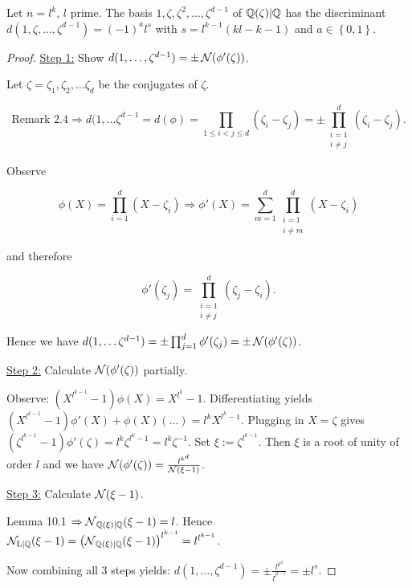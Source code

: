 \begin{Prop}
	Let $n = l^k$, $l$ prime. The basis $1, \zeta, \zeta^2, \dots, \zeta^{d-1}$ of $\mathbb{Q}(\zeta) \vert \mathbb{Q}$ has the discriminant $d(1, \zeta, \dots, \zeta^{d-1}) = (-1)^a l^s$ with $s = l^{k-1}(kl -k -1)$ and $a \in \left\lbrace  0,1 \right\rbrace $.
\end{Prop}
\begin{proof}
	\underline{Step 1:} Show $d(1,\dots, \zeta^{d-1}) = \pm \operatorname{\mathcal{N}}(\phi'(\zeta))$. 
	
	Let $\zeta = \zeta_1, \zeta_2, \dots \zeta_d$ be the conjugates of $\zeta$. 
	
	\[
		\text{Remark 2.4} \Rightarrow d(1, \dots \zeta^{d-1} = d(\phi) = \prod_{1 \leq i < j \leq d} (\zeta_i - \zeta_j) = \pm \prod_{\substack{i = 1 \\ i \neq j }}^d (\zeta_i - \zeta_j).
	\]
	
	Observe
	
	\[
		\phi(X) = \prod_{i=1}^d (X - \zeta_i) \Rightarrow \phi'(X) = \sum_{m=1}^d \prod_{\substack{i=1 \\ i \neq m}}^d (X - \zeta_i)
	\]
	
	and therefore
	
	\[
		\phi'(\zeta_j) = \prod_{\substack{i=1 \\ i \neq j}}^d (\zeta_j - \zeta_i).
	\]
	
	Hence we have $d(1, \dots \zeta^{d-1}) = \pm \prod_{j=1}^d \phi'(\zeta_j) = \pm \operatorname{\mathcal{N}} (\phi'(\zeta))$.
	
	\bigskip
	
	\underline{Step 2:} Calculate $\operatorname{\mathcal{N}}(\phi'(\zeta))$ partially.
	
	Observe: $(X^{l^{k-1}}-1)\phi(X) = X^{l^k}-1$. Differentiating yields $(X^{l^{k-1}}-1)\phi'(X) + \phi(X)(\dots) = l^k X^{l^k-1}$. Plugging in $X = \zeta$ gives $(\zeta^{l^{k-1}}-1)\phi'(\zeta) = l^k \zeta^{l^k-1} = l^k \zeta^{-1}$. Set $\xi := \zeta^{l^{k-1}}$. Then $\xi$ is a root of unity of order $l$ and we have $\operatorname{\mathcal{N}}(\phi'(\zeta)) = \frac{l^{k^d}}{\operatorname{\mathcal{N}}(\xi - 1)}$.
	
	\bigskip
	
	\underline{Step 3:} Calculate $\operatorname{\mathcal{N}}(\xi - 1)$.
	
	Lemma 10.1 $\Rightarrow \operatorname{\mathcal{N}}_{\mathbb{Q}(\xi) \vert \mathbb{Q}} (\xi - 1) = l$. Hence $\operatorname{\mathcal{N}_{L \vert \mathbb{Q}}} (\xi - 1) = \left(   \operatorname{\mathcal{N}}_{\mathbb{Q}(\xi) \vert \mathbb{Q}} (\xi - 1) \right) ^{l^{k-1}} = l^{l^{k-1}}$.
	
	Now combining all 3 steps yields: $d(1, \dots, \zeta^{d-1}) = \pm \frac{l^{k^d}}{l^{l^{k-1}}} = \pm l^s$.
\end{proof}

